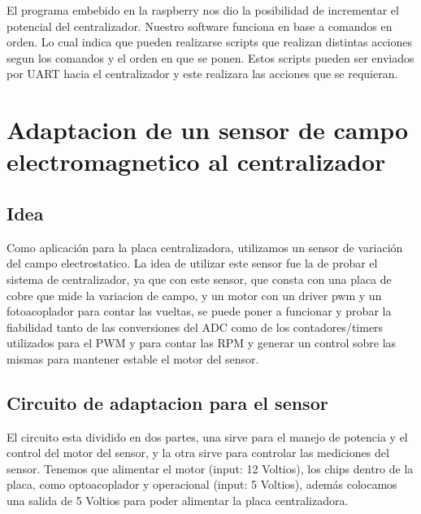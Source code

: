 \documentclass[a4paper]{article}
\begin{document}
El programa embebido en la raspberry nos dio la posibilidad de incrementar el potencial del centralizador. Nuestro software funciona en base a comandos en orden. Lo cual indica que pueden realizarse scripts que realizan distintas acciones segun los comandos y el orden en que se ponen. Estos scripts pueden ser enviados por UART hacia el centralizador y este realizara las acciones que se requieran. 

\section{Adaptacion de un sensor de campo electromagnetico al centralizador} %
\label{sec:adaptacion_de_un_sensor_de_campo_electromagnetico_al_centralizador}

\subsection{Idea} %
\label{sub:idea}

Como aplicación para la placa centralizadora, utilizamos un sensor de variación del campo electrostatico. La idea de utilizar este sensor fue la de probar el sistema de centralizador, ya que con este sensor, que consta con una placa de cobre que mide la variacion de campo, y un motor con un driver pwm y un fotoacoplador para contar las vueltas, se puede poner a funcionar y probar la fiabilidad tanto de las conversiones del ADC como de los contadores/timers utilizados para el PWM y para contar las RPM y generar un control sobre las mismas para mantener estable el motor del sensor.




\subsection{Circuito de adaptacion para el sensor} %
\label{sub:circuito_de_adaptacion_para_el_sensor}

El circuito esta dividido en dos partes, una sirve para el manejo de potencia y el control del motor del sensor, y la otra sirve para controlar las mediciones del sensor.
Tenemos que alimentar el motor (input: 12 Voltios), los chips dentro de la placa, como optoacoplador y operacional (input: 5 Voltios), además colocamos una salida de 5 Voltios para poder alimentar la placa centralizadora. 
\end{document}
